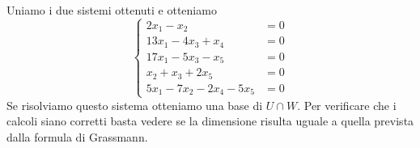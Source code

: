 Uniamo i due sistemi ottenuti e otteniamo 
\begin{equation*}
	\begin{cases}
		2x_1 - x_2                & = 0 \\ 
		13x_1 - 4x_3 + x_4        & = 0 \\ 
		17x_1 - 5x_3 - x_5        & = 0 \\
		x_2 + x_3 + 2x_5          & = 0 \\
		5x_1 - 7x_2 - 2x_4 - 5x_5 & = 0
	\end{cases}
\end{equation*}
Se risolviamo questo sistema otteniamo una base di $U \cap W$. Per verificare che i calcoli 
siano corretti basta vedere se la dimensione risulta uguale a quella prevista dalla formula 
di Grassmann.